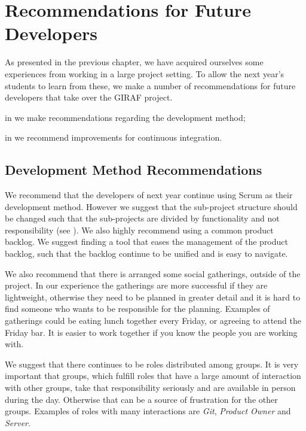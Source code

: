 \chapter{Recommendations for Future Developers}\label{chap:future_dev_recommendations}
As presented in the previous chapter, we have acquired ourselves some experiences from working in a large project setting. To allow the next year's students to learn from these, we make a number of recommendations for future developers that take over the GIRAF project.

\begin{chapterorganization}
  \item in  we make recommendations regarding the development method;
  \item in  we recommend improvements for continuous integration.
\end{chapterorganization}

\section{Development Method Recommendations}\label{sec:dev_recommentations}
We recommend that the developers of next year continue using Scrum as their development method. However we suggest that the sub-project structure should be changed such that the sub-projects are divided by functionality and not responsibility (see ). We also highly recommend using a common product backlog. We suggest finding a tool that eases the management of the product backlog, such that the backlog continue to be unified and is easy to navigate.

We also recommend that there is arranged some social gatherings, outside of the project. In our experience the gatherings are more successful if they are lightweight, otherwise they need to be planned in greater detail and it is hard to find someone who wants to be responsible for the planning. Examples of gatherings could be eating lunch together every Friday, or agreeing to attend the Friday bar. It is easier to work together if you know the people you are working with.

We suggest that there continues to be roles distributed among groups. It is very important that groups, which fulfill roles that have a large amount of interaction with other groups, take that responsibility seriously and are available in person during the day. Otherwise that can be a source of frustration for the other groups. Examples of roles with many interactions are \emph{Git}, \emph{Product Owner} and \emph{Server}.

